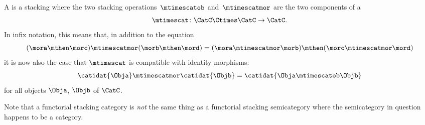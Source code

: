 \begin{ctdefinition}
    \label{def:functorial-stacking-cat}
    A  is a stacking  where the two stacking operations~$\mtimescatob$ and~$\mtimescatmor$ are the two components of a  \begin{equation}
        \mtimescat\colon \CatC \Ctimes \CatC \to \CatC.
    \end{equation}
    In infix notation, this means that, in addition to the equation
    \begin{equation}
        (\mora \mthen \morc )
        \mtimescatmor (\morb \mthen \mord )
        =
        (\mora \mtimescatmor \morb )
        \mthen (\morc \mtimescatmor \mord )
    \end{equation}
    it is now also the case that $\mtimescat$ is compatible with identity morphisms:
    \begin{equation}
        \catidat{\Obja} \mtimescatmor \catidat{\Objb} = \catidat{\Obja \mtimescatob \Objb}
    \end{equation}
    for all objects $\Obja$, $\Objb$ of $\CatC$.
\end{ctdefinition}

\begin{remark}
    Note that a functorial stacking category is \emph{not} the same thing as a functorial stacking semicategory where the semicategory in question happens to be a category.
\end{remark}

